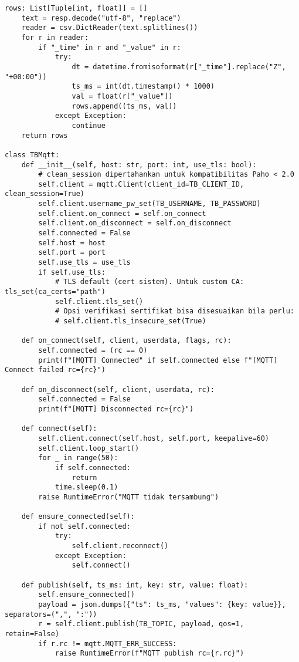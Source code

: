 \documentclass[a4paper, 12pt]{article}
\begin{document}
\begin{lstlisting}[style=pythonstyle, caption={InfluxDB DWSIM dan Kirim ke Thingsboard (python)}]
    rows: List[Tuple[int, float]] = []
    text = resp.decode("utf-8", "replace")
    reader = csv.DictReader(text.splitlines())
    for r in reader:
        if "_time" in r and "_value" in r:
            try:
                dt = datetime.fromisoformat(r["_time"].replace("Z", "+00:00"))
                ts_ms = int(dt.timestamp() * 1000)
                val = float(r["_value"])
                rows.append((ts_ms, val))
            except Exception:
                continue
    return rows

class TBMqtt:
    def __init__(self, host: str, port: int, use_tls: bool):
        # clean_session dipertahankan untuk kompatibilitas Paho < 2.0
        self.client = mqtt.Client(client_id=TB_CLIENT_ID, clean_session=True)
        self.client.username_pw_set(TB_USERNAME, TB_PASSWORD)
        self.client.on_connect = self.on_connect
        self.client.on_disconnect = self.on_disconnect
        self.connected = False
        self.host = host
        self.port = port
        self.use_tls = use_tls
        if self.use_tls:
            # TLS default (cert sistem). Untuk custom CA: tls_set(ca_certs="path")
            self.client.tls_set()
            # Opsi verifikasi sertifikat bisa disesuaikan bila perlu:
            # self.client.tls_insecure_set(True)
    
    def on_connect(self, client, userdata, flags, rc):
        self.connected = (rc == 0)
        print(f"[MQTT] Connected" if self.connected else f"[MQTT] Connect failed rc={rc}")
    
    def on_disconnect(self, client, userdata, rc):
        self.connected = False
        print(f"[MQTT] Disconnected rc={rc}")
    
    def connect(self):
        self.client.connect(self.host, self.port, keepalive=60)
        self.client.loop_start()
        for _ in range(50):
            if self.connected:
                return
            time.sleep(0.1)
        raise RuntimeError("MQTT tidak tersambung")
    
    def ensure_connected(self):
        if not self.connected:
            try:
                self.client.reconnect()
            except Exception:
                self.connect()
    
    def publish(self, ts_ms: int, key: str, value: float):
        self.ensure_connected()
        payload = json.dumps({"ts": ts_ms, "values": {key: value}}, separators=(",", ":"))
        r = self.client.publish(TB_TOPIC, payload, qos=1, retain=False)
        if r.rc != mqtt.MQTT_ERR_SUCCESS:
            raise RuntimeError(f"MQTT publish rc={r.rc}")


\end{lstlisting}
\end{document}
